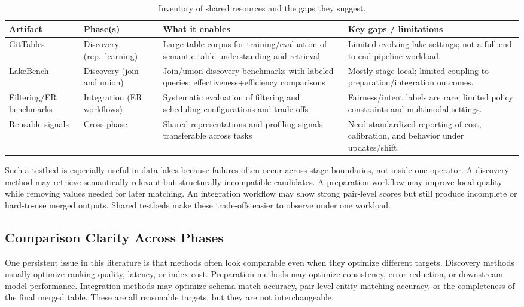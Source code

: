 \documentclass[sigconf,nonacm]{acmart}
\newcommand{\tbl}{%
  \scriptsize
  \setlength{\tabcolsep}{4pt}%
  \renewcommand{\arraystretch}{1.12}%
}
\begin{document}
\begin{table}[!htbp]
\centering
\caption{Inventory of shared resources and the gaps they suggest.}
\label{tab:benchmark_inventory}
\tbl
\begin{tabularx}{\textwidth}{@{}p{26mm}p{26mm}Y Y@{}}
\toprule
\textbf{Artifact} & \textbf{Phase(s)} & \textbf{What it enables} & \textbf{Key gaps / limitations} \\
\midrule
GitTables~\cite{10.1145/3588710} &
Discovery (rep.\ learning) &
Large table corpus for training/evaluation of semantic table understanding and retrieval &
Limited evolving-lake settings; not a full end-to-end pipeline workload. \\
\addlinespace[0.25em]
LakeBench~\cite{10.14778/3659437.3659448} &
Discovery (join and union) &
Join/union discovery benchmarks with labeled queries; effectiveness+efficiency comparisons &
Mostly stage-local; limited coupling to preparation/integration outcomes. \\
\addlinespace[0.25em]
Filtering/ER benchmarks~\cite{10184692} &
Integration (ER workflows) &
Systematic evaluation of filtering and scheduling configurations and trade-offs &
Fairness/intent labels are rare; limited policy constraints and multimodal settings. \\
\addlinespace[0.25em]
Reusable signals~\cite{10184556,10.1145/3588929} &
Cross-phase &
Shared representations and profiling signals transferable across tasks &
Need standardized reporting of cost, calibration, and behavior under updates/shift. \\
\bottomrule
\end{tabularx}
\end{table}

Such a testbed is especially useful in data lakes because failures often occur across stage boundaries, not inside one operator. A discovery method may retrieve semantically relevant but structurally incompatible candidates. A preparation workflow may improve local quality while removing values needed for later matching. An integration workflow may show strong pair-level scores but still produce incomplete or hard-to-use merged outputs. Shared testbeds make these trade-offs easier to observe under one workload.

\subsection{Comparison Clarity Across Phases}
One persistent issue in this literature is that methods often look comparable even when they optimize different targets. Discovery methods usually optimize ranking quality, latency, or index cost. Preparation methods may optimize consistency, error reduction, or downstream model performance. Integration methods may optimize schema-match accuracy, pair-level entity-matching accuracy, or the completeness of the final merged table. These are all reasonable targets, but they are not interchangeable.
\end{document}
